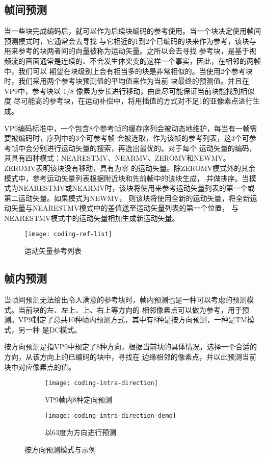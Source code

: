 \subsection{帧间预测}
\label{subsec:inter}

当一些块完成编码后，就可以作为后续块编码的参考使用。当一个块决定使用帧间预测模式时，它通常会去寻找
与它相近的1到2个已编码的块来作为参考，该块与用来参考的块两者间的向量被称为运动矢量。之所以会去寻找
参考块，是基于视频流的画面通常是连续的、不会发生体突变的这样一个事实，因此，在相邻的两帧中，我们可以
期望在块级别上会有相当多的块是非常相似的。当使用2个参考块时，我们采用两个参考块预测值的平均值来作为当前
块最终的预测值。并且在VP9中，参考块以 $1/8$ 像素为步长进行移动，由此尽可能保证当前块能找到相似度
尽可能高的参考块，在运动补偿中，将用插值的方式对不足1的亚像素点进行生成。

VP9编码标准中，一个包含8个参考帧的缓存序列会被动态地维护，每当有一帧需要被编码时，序列中的3个可参考帧
会被选取，作为该帧的参考列表，这3个可参考帧中会分别进行运动矢量的搜索，再选出最优的。对于每个
运动矢量的编码，其具有四种模式：NEARESTMV、NEARMV、ZEROMV和NEWMV。ZEROMV表明该块没有移动，具有为零
的运动矢量。除ZEROMV模式外的其余模式中，参考运动矢量列表根据附近块和先前帧中的该块生成，
并做排序。当模式为NEARESTMV或NEARMV时，该块将使用来参考运动矢量列表的第一个或第二运动矢量。如果模式为NEWMV，
则该块将使用全新的运动矢量，将全新运动矢量与NEARESTMV模式中的差值送至运动矢量列表的第一个位置，
与NEARESTMV模式中的运动矢量相加生成新运动矢量。

\begin{figure}[H] %
  \centering
  \texttt{[image: coding-ref-list]}
  \caption{运动矢量参考列表}
  \label{fig:coding-ref-list}
\end{figure}

\subsection{帧内预测}
\label{subsec:intra}

当帧间预测无法给出令人满意的参考块时，帧内预测也是一种可以考虑的预测模式。当前块的左、左上、上、右上等方向的
相邻像素点可以做为参考，用于预测。VP9制定了总共10种帧内预测方式，其中有8种是按方向预测，一种是TM模式，另一种
是DC模式。

按方向预测是指VP9中规定了8种方向，根据当前块的具体情况，选择一个合适的方向，从该方向上的已编码的块中，寻找在
边缘相邻的像素点，并以此预测当前块中对应像素点的值。

\begin{figure}[H]
  \centering%
  \begin{subfigure}{0.43\textwidth}
    \centering
    \texttt{[image: coding-intra-direction]}
    \caption{VP9帧内8种定向预测}
  \end{subfigure}%
  \hspace{2em}%
  \begin{subfigure}{0.43\textwidth}
    \centering
    \texttt{[image: coding-intra-direction-demo]}
    \caption{以63度为方向进行预测}
  \end{subfigure}
  \caption{按方向预测模式与示例}
\end{figure}

